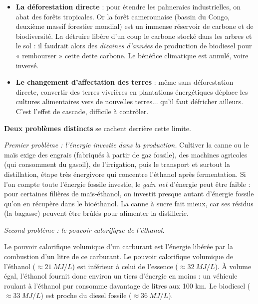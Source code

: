 \documentclass[11pt]{article}
\newcommand{\cle}[1]{{\popxbold\color{popdark}#1}}
\newcounter{popsec}
\newcounter{popsub}
\newcommand{\courssub}[1]{%
  \stepcounter{popsub}%
  \par\vspace{9pt}\noindent{\popxbold\fontsize{11.5}{13}\selectfont\color{popink}{\color{poporange}\thepopsec.\thepopsub}\hspace{6pt}#1}\par\nopagebreak\vspace{4pt}
}
\begin{document}
\begin{itemize}
\item \textbf{La déforestation directe} : pour étendre les palmeraies industrielles, on abat des forêts tropicales. Or la forêt camerounaise (bassin du Congo, deuxième massif forestier mondial) est un immense réservoir de carbone et de biodiversité. La détruire libère d'un coup le carbone stocké dans les arbres et le sol : il faudrait alors des \emph{dizaines d'années} de production de biodiesel pour « rembourser » cette dette carbone. Le bénéfice climatique est annulé, voire inversé.
\item \textbf{Le changement d'affectation des terres} : même sans déforestation directe, convertir des terres vivrières en plantations énergétiques déplace les cultures alimentaires vers de nouvelles terres... qu'il faut défricher ailleurs. C'est l'effet de cascade, difficile à contrôler.
\end{itemize}

\courssub{Limite 3 : le rendement énergétique}

\textbf{Deux problèmes distincts} se cachent derrière cette limite.

\emph{Premier problème : l'énergie investie dans la production.} Cultiver la canne ou le maïs exige des engrais (fabriqués à partir de gaz fossile), des machines agricoles (qui consomment du gasoil), de l'irrigation, puis le transport et surtout la \cle{distillation}, étape très énergivore qui concentre l'éthanol après fermentation. Si l'on compte toute l'énergie fossile investie, le \emph{gain net} d'énergie peut être faible : pour certaines filières de maïs-éthanol, on investit presque autant d'énergie fossile qu'on en récupère dans le bioéthanol. La canne à sucre fait mieux, car ses résidus (la bagasse) peuvent être brûlés pour alimenter la distillerie.

\emph{Second problème : le pouvoir calorifique de l'éthanol.}

\begin{propriete}
Le \cle{pouvoir calorifique volumique} d'un carburant est l'énergie libérée par la combustion d'un litre de ce carburant. Le pouvoir calorifique volumique de l'éthanol ($\approx \SI{21}{MJ/L}$) est inférieur à celui de l'essence ($\approx \SI{32}{MJ/L}$). À volume égal, l'éthanol fournit donc environ un tiers d'énergie en moins : un véhicule roulant à l'éthanol pur consomme davantage de litres aux 100 km. Le biodiesel ($\approx \SI{33}{MJ/L}$) est proche du diesel fossile ($\approx \SI{36}{MJ/L}$).
\end{propriete}
\end{document}
